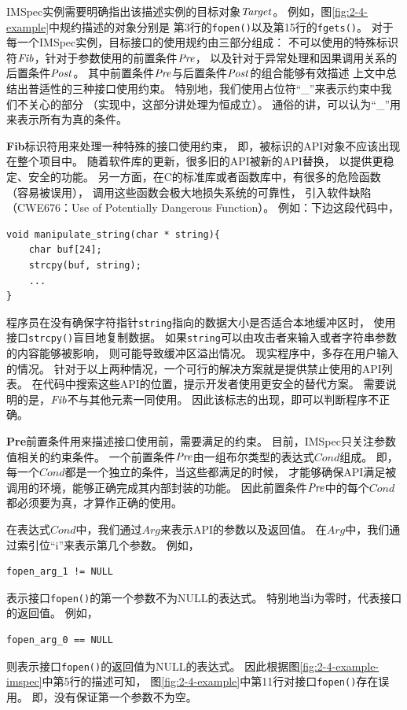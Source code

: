 

IMSpec实例需要明确指出该描述实例的目标对象$\mathit{Target}$。
例如，图\ref{fig:2-4-example}中规约描述的对象分别是
第3行的\texttt{fopen()}以及第15行的\texttt{fgets()}。
对于每一个IMSpec实例，目标接口的使用规约由三部分组成：
不可以使用的特殊标识符$\mathit{Fib}$，针对于参数使用的前置条件$\mathit{Pre}$，
以及针对于异常处理和因果调用关系的后置条件$\mathit{Post}$。
其中前置条件$\mathit{Pre}$与后置条件$\mathit{Post}$的组合能够有效描述
上文中总结出普适性的三种接口使用约束。
特别地，我们使用占位符“\_”来表示约束中我们不关心的部分
（实现中，这部分讲处理为恒成立）。
通俗的讲，可以认为“\_”用来表示所有为真的条件。

\textbf{Fib}标识符用来处理一种特殊的接口使用约束，
即，被标识的API对象不应该出现在整个项目中。
随着软件库的更新，很多旧的API被新的API替换，
以提供更稳定、安全的功能。
另一方面，在C的标准库或者函数库中，有很多的危险函数（容易被误用），
调用这些函数会极大地损失系统的可靠性，
引入软件缺陷（CWE676：Use of Potentially Dangerous Function）。
例如：下边这段代码中，
\begin{lstlisting}[language={[ANSI]C},
basicstyle=\linespread{0.8}\listingsfont,
numbers=none,
xleftmargin=.3\textwidth]
void manipulate_string(char * string){
	char buf[24];
	strcpy(buf, string);
	...
}
\end{lstlisting}
程序员在没有确保字符指针\texttt{string}指向的数据大小是否适合本地缓冲区时，
使用接口\texttt{strcpy()}盲目地复制数据。
如果\texttt{string}可以由攻击者来输入或者字符串参数的内容能够被影响，
则可能导致缓冲区溢出情况。
现实程序中，多存在用户输入的情况。
针对于以上两种情况，一个可行的解决方案就是提供禁止使用的API列表。
在代码中搜索这些API的位置，提示开发者使用更安全的替代方案。
需要说明的是，$\mathit{Fib}$不与其他元素一同使用。
因此该标志的出现，即可以判断程序不正确。


\textbf{Pre}前置条件用来描述接口使用前，需要满足的约束。
目前，IMSpec只关注参数值相关的约束条件。
一个前置条件$\mathit{Pre}$由一组布尔类型的表达式$\mathit{Cond}$组成。
即，每一个$\mathit{Cond}$都是一个独立的条件，当这些都满足的时候，
才能够确保API满足被调用的环境，能够正确完成其内部封装的功能。
因此前置条件$\mathit{Pre}$中的每个$\mathit{Cond}$都必须要为真，才算作正确的使用。

在表达式$\mathit{Cond}$中，我们通过$\mathit{Arg}$来表示API的参数以及返回值。
在$\mathit{Arg}$中，我们通过索引位“i”来表示第几个参数。
例如，
\begin{lstlisting}[language={[ANSI]C},
basicstyle=\linespread{0.8}\listingsfont,
numbers=none,
xleftmargin=.3\textwidth]
fopen_arg_1 != NULL
\end{lstlisting}
表示接口\texttt{fopen()}的第一个参数不为NULL的表达式。
特别地当i为零时，代表接口的返回值。
例如，
\begin{lstlisting}[language={[ANSI]C},
basicstyle=\linespread{0.8}\listingsfont,
numbers=none,
xleftmargin=.3\textwidth,]
fopen_arg_0 == NULL
\end{lstlisting}
则表示接口\texttt{fopen()}的返回值为NULL的表达式。
因此根据图\ref{fig:2-4-example-imspec}中第5行的描述可知，
图\ref{fig:2-4-example}中第11行对接口\texttt{fopen()}存在误用。
即，没有保证第一个参数不为空。


